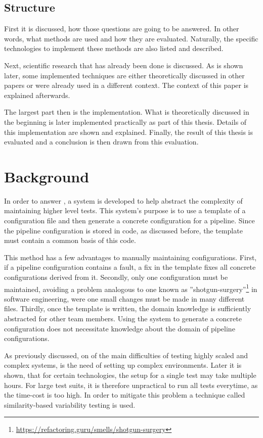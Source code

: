 \section{Structure}\label{sec:structure}

First it is discussed, how those questions are going to be answered.
In other words, what methods are used and how they are evaluated.
Naturally, the specific technologies to implement these methods are also listed and described.

Next, scientific research that has already been done is discussed.
As is shown later, some implemented techniques are either theoretically discussed in other papers or were already used in a different context.
The context of this paper is explained afterwards.

The largest part then is 
the implementation.
What is theoretically discussed in the beginning is later implemented practically as part of this thesis.
Details of this implementation are shown and explained.
Finally, the result of this thesis is evaluated and a conclusion is then drawn from this evaluation.

\chapter{Background}\label{ch:background}

In order to answer , a system is developed to help abstract the complexity of maintaining higher level tests.
This system's purpose is to use a template of a configuration file and then generate a concrete configuration for a pipeline.
Since the pipeline configuration is stored in code, as discussed before, the template must contain a common basis of this code.

This method has a few advantages to manually maintaining configurations.
First, if a pipeline configuration contains a fault, a fix in the template fixes all concrete configurations derived from it.
Secondly, only one configuration must be maintained, avoiding a problem analogous to one known as ''shotgun-surgery''\footnote{\url{https://refactoring.guru/smells/shotgun-surgery}} in software engineering, were one small changes must be made in many different files.
Thirdly, once the template is written, the domain knowledge is sufficiently abstracted for other team members.
Using the system to generate a concrete configuration does not necessitate knowledge about the domain of pipeline configurations.

As previously discussed, on of the main difficulties of testing highly scaled and complex systems, is the need of setting up complex environments.
Later it is shown, that for certain technologies, the setup for a single test may take multiple hours.
For large test suits, it is therefore unpractical to run all tests everytime, as the time-cost is too high.
In order to mitigate this problem a technique called similarity-based variability testing is used.

